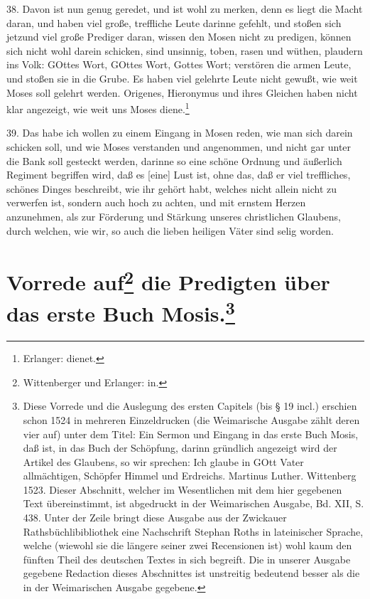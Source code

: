 38. Davon ist nun genug geredet, und ist wohl zu merken, denn es liegt die Macht daran, und haben viel große, treffliche Leute darinne gefehlt, und stoßen sich jetzund viel große Prediger daran, wissen den Mosen nicht zu predigen, können sich nicht wohl darein schicken, sind unsinnig, toben, rasen und wüthen, plaudern ins Volk: GOttes Wort, GOttes Wort, Gottes Wort; verstören die armen Leute, und stoßen sie in die Grube. Es haben viel gelehrte Leute nicht gewußt, wie weit Moses soll gelehrt werden. Origenes, Hieronymus und ihres Gleichen haben nicht klar angezeigt, wie weit uns Moses diene.\footnote{Erlanger: dienet.}

39. Das habe ich wollen zu einem Eingang in Mosen reden, wie man sich darein schicken soll, und wie Moses verstanden und angenommen, und nicht gar unter die Bank soll gesteckt werden, darinne so eine schöne Ordnung und äußerlich Regiment begriffen wird, daß es [eine] Lust ist, ohne das, daß er viel treffliches, schönes Dinges beschreibt, wie ihr gehört habt, welches nicht allein nicht zu verwerfen ist, sondern auch hoch zu achten, und mit ernstem Herzen anzunehmen, als zur Förderung und Stärkung unseres christlichen Glaubens, durch welchen, wie wir, so auch die lieben heiligen Väter sind selig worden.

\section[Vorrede auf die Predigten über das erste Buch Mosis]{Vorrede auf\footnote{Wittenberger und Erlanger: in.} die Predigten über das erste Buch Mosis.\footnote{Diese Vorrede und die Auslegung des ersten Capitels (bis § 19 incl.) erschien schon 1524 in mehreren Einzeldrucken (die Weimarische Ausgabe zählt deren vier auf) unter dem Titel: Ein Sermon und Eingang in das erste Buch Mosis, daß ist, in das Buch der Schöpfung, darinn gründlich angezeigt wird der Artikel des Glaubens, so wir sprechen: Ich glaube in GOtt Vater allmächtigen, Schöpfer Himmel und Erdreichs. Martinus Luther. Wittenberg 1523. Dieser Abschnitt, welcher im Wesentlichen mit dem hier gegebenen Text übereinstimmt, ist abgedruckt in der Weimarischen Ausgabe, Bd. XII, S. 438. Unter der Zeile bringt diese Ausgabe aus der Zwickauer Rathsbüchlibibliothek eine Nachschrift Stephan Roths in lateinischer Sprache, welche (wiewohl sie die längere seiner zwei Recensionen ist) wohl kaum den fünften Theil des deutschen Textes in sich begreift. Die in unserer Ausgabe gegebene Redaction dieses Abschnittes ist unstreitig bedeutend besser als die in der Weimarischen Ausgabe gegebene.}}

